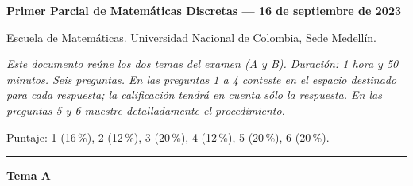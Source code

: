 \documentclass[11pt]{article}
\begin{document}
{\large\bfseries Primer Parcial de Matemáticas Discretas --- 16 de septiembre de 2023}

\medskip
\noindent Escuela de Matemáticas. Universidad Nacional de Colombia, Sede Medellín.

\medskip
\noindent\textit{Este documento reúne los dos temas del examen (A y B). Duración: 1 hora y 50 minutos. Seis preguntas. En las preguntas 1 a 4 conteste en el espacio destinado para cada respuesta; la calificación tendrá en cuenta sólo la respuesta. En las preguntas 5 y 6 muestre detalladamente el procedimiento.}

\medskip
\noindent Puntaje: 1 (16\,\%), 2 (12\,\%), 3 (20\,\%), 4 (12\,\%), 5 (20\,\%), 6 (20\,\%).

\bigskip\hrule\medskip
\begin{center}\bfseries\large Tema A\end{center}
\end{document}
